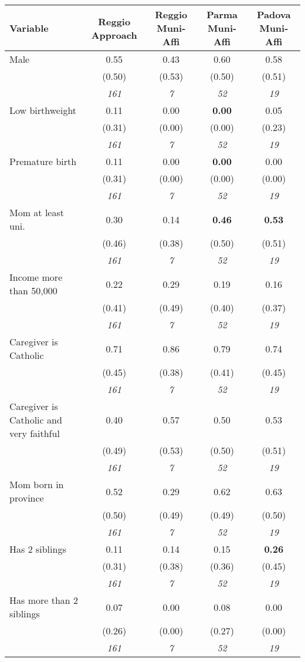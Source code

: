 \begin{tabular}{lcccc}
\toprule
 Variable & Reggio Approach & Reggio Muni-Affi & Parma Muni-Affi & Padova Muni-Affi \\
\midrule
Male & 0.55 & 0.43 & 0.60 & 0.58 \\
 & (0.50) & (0.53) & (0.50) & (0.51) \\
 & \textit{161} & \textit{7} & \textit{52} & \textit{19} \\
Low birthweight & 0.11 & 0.00 & \textbf{0.00} & 0.05 \\
 & (0.31) & (0.00) & (0.00) & (0.23) \\
 & \textit{161} & \textit{7} & \textit{52} & \textit{19} \\
Premature birth & 0.11 & 0.00 & \textbf{0.00} & 0.00 \\
 & (0.31) & (0.00) & (0.00) & (0.00) \\
 & \textit{161} & \textit{7} & \textit{52} & \textit{19} \\
Mom at least uni. & 0.30 & 0.14 & \textbf{0.46} & \textbf{0.53} \\
 & (0.46) & (0.38) & (0.50) & (0.51) \\
 & \textit{161} & \textit{7} & \textit{52} & \textit{19} \\
Income more than 50,000 & 0.22 & 0.29 & 0.19 & 0.16 \\
 & (0.41) & (0.49) & (0.40) & (0.37) \\
 & \textit{161} & \textit{7} & \textit{52} & \textit{19} \\
Caregiver is Catholic & 0.71 & 0.86 & 0.79 & 0.74 \\
 & (0.45) & (0.38) & (0.41) & (0.45) \\
 & \textit{161} & \textit{7} & \textit{52} & \textit{19} \\
Caregiver is Catholic and very faithful & 0.40 & 0.57 & 0.50 & 0.53 \\
 & (0.49) & (0.53) & (0.50) & (0.51) \\
 & \textit{161} & \textit{7} & \textit{52} & \textit{19} \\
Mom born in province & 0.52 & 0.29 & 0.62 & 0.63 \\
 & (0.50) & (0.49) & (0.49) & (0.50) \\
 & \textit{161} & \textit{7} & \textit{52} & \textit{19} \\
Has 2 siblings & 0.11 & 0.14 & 0.15 & \textbf{0.26} \\
 & (0.31) & (0.38) & (0.36) & (0.45) \\
 & \textit{161} & \textit{7} & \textit{52} & \textit{19} \\
Has more than 2 siblings & 0.07 & 0.00 & 0.08 & 0.00 \\
 & (0.26) & (0.00) & (0.27) & (0.00) \\
 & \textit{161} & \textit{7} & \textit{52} & \textit{19} \\
\bottomrule
\end{tabular}
